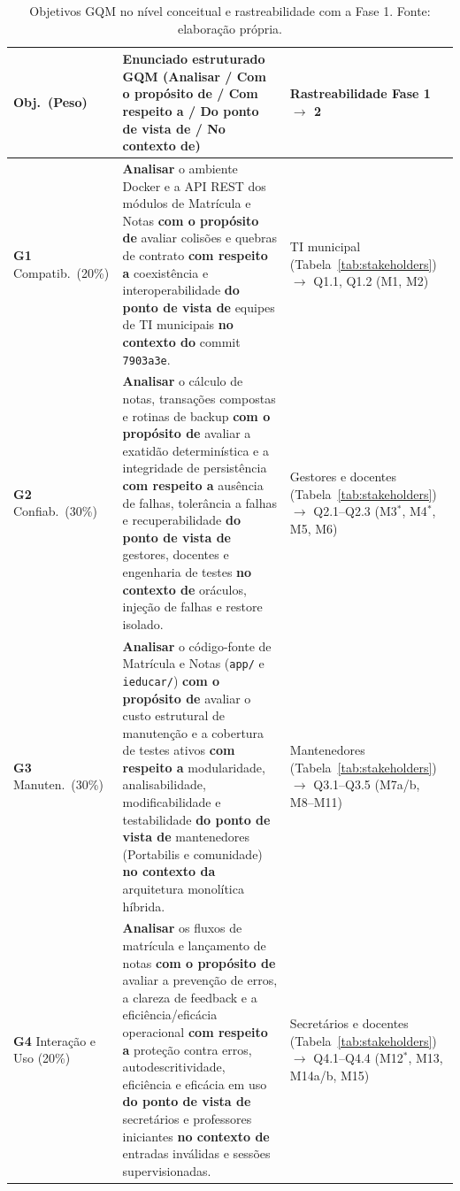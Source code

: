 \documentclass[conference]{model/IEEEtran}%
\begin{document}
\begin{table}[!t]
\centering
\caption{Objetivos GQM no nível conceitual e rastreabilidade com a Fase 1. Fonte: elaboração própria.}
\label{tab:objetivos}
\footnotesize
\setlength{\tabcolsep}{2.5pt}
\begin{tabular}{@{}L{1.3cm}L{10.9cm}L{4.0cm}@{}}
\toprule
\textbf{Obj.\ (Peso)} & \textbf{Enunciado estruturado GQM (Analisar / Com o propósito de / Com respeito a / Do ponto de vista de / No contexto de)} & \textbf{Rastreabilidade Fase 1 $\rightarrow$ 2} \\
\midrule
\textbf{G1} Compatib.\ (20\%) &
\textbf{Analisar} o ambiente Docker e a API REST dos módulos de Matrícula e Notas \textbf{com o propósito de} avaliar colisões e quebras de contrato \textbf{com respeito a} coexistência e interoperabilidade \textbf{do ponto de vista de} equipes de TI municipais \textbf{no contexto do} commit \texttt{7903a3e}. &
TI municipal (Tabela~\ref{tab:stakeholders}) $\rightarrow$ Q1.1, Q1.2 (M1, M2) \\
\addlinespace[2pt]
\textbf{G2} Confiab.\ (30\%) &
\textbf{Analisar} o cálculo de notas, transações compostas e rotinas de backup \textbf{com o propósito de} avaliar a exatidão determinística e a integridade de persistência \textbf{com respeito a} ausência de falhas, tolerância a falhas e recuperabilidade \textbf{do ponto de vista de} gestores, docentes e engenharia de testes \textbf{no contexto de} oráculos, injeção de falhas e restore isolado. &
Gestores e docentes (Tabela~\ref{tab:stakeholders}) $\rightarrow$ Q2.1--Q2.3 (M3$^*$, M4$^*$, M5, M6) \\
\addlinespace[2pt]
\textbf{G3} Manuten.\ (30\%) &
\textbf{Analisar} o código-fonte de Matrícula e Notas (\texttt{app/} e \texttt{ieducar/}) \textbf{com o propósito de} avaliar o custo estrutural de manutenção e a cobertura de testes ativos \textbf{com respeito a} modularidade, analisabilidade, modificabilidade e testabilidade \textbf{do ponto de vista de} mantenedores (Portabilis e comunidade) \textbf{no contexto da} arquitetura monolítica híbrida. &
Mantenedores (Tabela~\ref{tab:stakeholders}) $\rightarrow$ Q3.1--Q3.5 (M7a/b, M8--M11) \\
\addlinespace[2pt]
\textbf{G4} Interação e Uso (20\%) &
\textbf{Analisar} os fluxos de matrícula e lançamento de notas \textbf{com o propósito de} avaliar a prevenção de erros, a clareza de feedback e a eficiência/eficácia operacional \textbf{com respeito a} proteção contra erros, autodescritividade, eficiência e eficácia em uso \textbf{do ponto de vista de} secretários e professores iniciantes \textbf{no contexto de} entradas inválidas e sessões supervisionadas. &
Secretários e docentes (Tabela~\ref{tab:stakeholders}) $\rightarrow$ Q4.1--Q4.4 (M12$^*$, M13, M14a/b, M15) \\
\bottomrule
\end{tabular}
\end{table}
\end{document}
